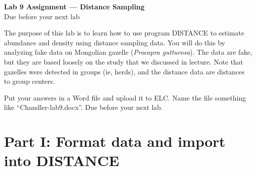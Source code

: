 \documentclass[12pt]{article}
\begin{document}
{
  \Large
  \centering
  {\bf Lab 9 Assignment --- Distance Sampling} \\
  Due before your next lab \par
}

\vspace{10pt}


The purpose of this lab is to learn how to use program DISTANCE to
estimate abundance and density using distance sampling data. You will
do this by analyzing fake data on Mongolian gazelle ({\it Procapra
  gutturosa}). The data are fake, but they are based loosely on the
study that we discussed in lecture. Note that gazelles were detected
in groups (ie, herds), and the distance data are distances to group
centers. 

Put your answers in a Word file and upload it to ELC. Name the file
something like ``Chandler-lab9.docx''. Due before your next lab.  





\section*{\large Part I: Format data and import into DISTANCE}
\end{document}
